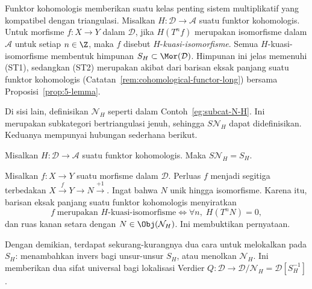 \begin{contoh}\label{eg:cohomological-functor-multiplicative}
	Funktor kohomologis memberikan suatu kelas penting sistem multiplikatif yang
	kompatibel dengan triangulasi. Misalkan $H: \mathcal{D} \to \mathcal{A}$
	suatu funktor kohomologis. Untuk morfisme $f: X \to Y$ dalam $\mathcal{D}$,
	jika $H(T^n f)$ merupakan isomorfisme dalam $\mathcal{A}$ untuk setiap
	$n \in \Z$, maka $f$ disebut $H$-\emph{kuasi-isomorfisme}. Semua
	$H$-kuasi-isomorfisme membentuk himpunan $S_H \subset \Mor(\mathcal{D})$.
	Himpunan ini jelas memenuhi (ST1), sedangkan (ST2) merupakan akibat dari
	barisan eksak panjang suatu funktor kohomologis
	(Catatan~\ref{rem:cohomological-functor-long}) bersama
	Proposisi~\ref{prop:5-lemma}.

	Di sisi lain, definisikan $\mathcal{N}_H$ seperti dalam
	Contoh~\ref{eg:subcat-N-H}. Ini merupakan subkategori bertriangulasi jenuh,
	sehingga $S\mathcal{N}_H$ dapat didefinisikan. Keduanya mempunyai hubungan
	sederhana berikut.
\end{contoh}

\begin{proposisi}\label{prop:cohomological-functor-multiplicative}
	Misalkan $H: \mathcal{D} \to \mathcal{A}$ suatu funktor kohomologis. Maka
	$S\mathcal{N}_H = S_H$.
\end{proposisi}

\begin{bukti}
	Misalkan $f: X \to Y$ suatu morfisme dalam $\mathcal{D}$. Perluas $f$
	menjadi segitiga terbedakan
	$X \xrightarrow{f} Y \to N \xrightarrow{+1}$. Ingat bahwa $N$ unik hingga
	isomorfisme. Karena itu, barisan eksak panjang suatu funktor kohomologis
	menyiratkan
	\[ f \;\text{merupakan $H$-kuasi-isomorfisme} \iff \forall n, \; H(T^n N) = 0, \]
	dan ruas kanan setara dengan $N \in \Obj(\mathcal{N}_H)$. Ini membuktikan
	pernyataan.
\end{bukti}

Dengan demikian, terdapat sekurang-kurangnya dua cara untuk melokalkan pada
$S_H$: menambahkan invers bagi unsur-unsur $S_H$, atau menolkan
$\mathcal{N}_H$. Ini memberikan dua sifat universal bagi lokalisasi Verdier
$Q: \mathcal{D} \to \mathcal{D}/\mathcal{N}_H
= \mathcal{D}[S_H^{-1}]$.

